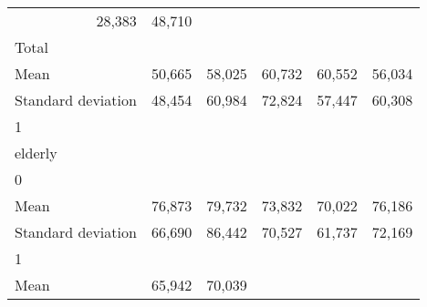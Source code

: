 \begin{tabular}{llllll}
  \multicolumn{1}{r}{28,383} &
  \multicolumn{1}{r}{48,710} \\
\multicolumn{1}{l}{\hspace{3em}Total} &
  \multicolumn{1}{|r}{} &
  \multicolumn{1}{r}{} &
  \multicolumn{1}{r}{} &
  \multicolumn{1}{r}{} &
  \multicolumn{1}{r}{} \\
\multicolumn{1}{l}{\hspace{4em}Mean} &
  \multicolumn{1}{|r}{50,665} &
  \multicolumn{1}{r}{58,025} &
  \multicolumn{1}{r}{60,732} &
  \multicolumn{1}{r}{60,552} &
  \multicolumn{1}{r}{56,034} \\
\multicolumn{1}{l}{\hspace{4em}Standard deviation} &
  \multicolumn{1}{|r}{48,454} &
  \multicolumn{1}{r}{60,984} &
  \multicolumn{1}{r}{72,824} &
  \multicolumn{1}{r}{57,447} &
  \multicolumn{1}{r}{60,308} \\
\multicolumn{1}{l}{\hspace{1em}1} &
  \multicolumn{1}{|r}{} &
  \multicolumn{1}{r}{} &
  \multicolumn{1}{r}{} &
  \multicolumn{1}{r}{} &
  \multicolumn{1}{r}{} \\
\multicolumn{1}{l}{\hspace{2em}elderly} &
  \multicolumn{1}{|r}{} &
  \multicolumn{1}{r}{} &
  \multicolumn{1}{r}{} &
  \multicolumn{1}{r}{} &
  \multicolumn{1}{r}{} \\
\multicolumn{1}{l}{\hspace{3em}0} &
  \multicolumn{1}{|r}{} &
  \multicolumn{1}{r}{} &
  \multicolumn{1}{r}{} &
  \multicolumn{1}{r}{} &
  \multicolumn{1}{r}{} \\
\multicolumn{1}{l}{\hspace{4em}Mean} &
  \multicolumn{1}{|r}{76,873} &
  \multicolumn{1}{r}{79,732} &
  \multicolumn{1}{r}{73,832} &
  \multicolumn{1}{r}{70,022} &
  \multicolumn{1}{r}{76,186} \\
\multicolumn{1}{l}{\hspace{4em}Standard deviation} &
  \multicolumn{1}{|r}{66,690} &
  \multicolumn{1}{r}{86,442} &
  \multicolumn{1}{r}{70,527} &
  \multicolumn{1}{r}{61,737} &
  \multicolumn{1}{r}{72,169} \\
\multicolumn{1}{l}{\hspace{3em}1} &
  \multicolumn{1}{|r}{} &
  \multicolumn{1}{r}{} &
  \multicolumn{1}{r}{} &
  \multicolumn{1}{r}{} &
  \multicolumn{1}{r}{} \\
\multicolumn{1}{l}{\hspace{4em}Mean} &
  \multicolumn{1}{|r}{65,942} &
  \multicolumn{1}{r}{70,039} &

\end{tabular}
